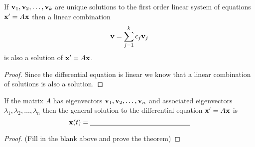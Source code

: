 \begin{thm}
    If ${\bf v}_1, {\bf v}_2, \dots, {\bf v}_k$ are unique solutions to the first
    order linear system of equations
    ${\bf x}'=A{\bf x}$ then a linear combination 
    \[ {\bf v} = \sum_{j=1}^k c_j {\bf v}_j \]
    is also a solution of ${\bf x}' = A {\bf x}$.
\end{thm}
\begin{proof}
    Since the differential equation is linear we know that a linear combination of
    solutions is also a solution.  
\end{proof}

\begin{thm}
    If the matrix $A$ has eigenvectors ${\bf v}_1, {\bf v}_2, \ldots, {\bf v}_n$ and associated
    eigenvectors $\lambda_1, \lambda_2, \ldots, \lambda_n$ then the general solution to
    the differential equation ${\bf x}' = A {\bf x}$ is
    \[ {\bf x}(t) = \underline{\hspace{2in}} \]
\end{thm}
\begin{proof}
    (Fill in the blank above and prove the theorem)
\end{proof}


